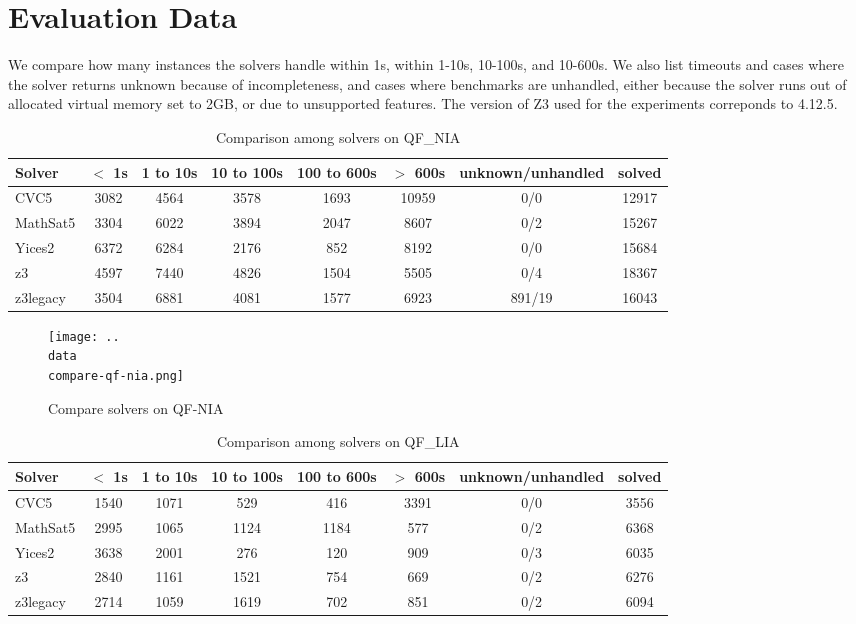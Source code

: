 \section{Evaluation Data}
\label{app:eval}

We compare how many instances the solvers handle within
1s, within 1-10s, 10-100s, and 10-600s. We also list
timeouts and cases where the solver returns unknown because of incompleteness,
and cases where benchmarks are unhandled, either because the solver runs out of allocated virtual memory set to 2GB,
or due to unsupported features. The version of Z3 used for the experiments correponds to 4.12.5.


\begin{table}
  \begin{tabular}{|l|c|c|c|c|c|c|c|}
    \hline
    Solver & $<$ 1s & 1 to 10s & 10 to 100s & 100 to 600s & $>$ 600s & unknown/unhandled & solved \\
    \hline
    CVC5 & 3082 & 4564 & 3578 & 1693 & 10959 & 0/0 & 12917 \\
    \hline
    MathSat5 & 3304 & 6022 & 3894 & 2047 & 8607 & 0/2 & 15267 \\
    \hline
    Yices2 & 6372 & 6284 & 2176 & 852 & 8192 & 0/0 & 15684 \\
    \hline
    z3 & 4597 & 7440 & 4826 & 1504 & 5505 & 0/4 & 18367 \\
    \hline
    z3legacy & 3504 & 6881 & 4081 & 1577 & 6923 & 891/19 & 16043 \\
    \hline
    \end{tabular}
  \caption{Comparison among solvers on QF\_NIA \label{tab:compare-qf-nia}}
\end{table}

\begin{figure}[htbp]
  \centering
  \texttt{[image: ..\\data\\compare-qf-nia.png]}
  \caption{Compare solvers on QF-NIA }
  \label{fig:organization}
\end{figure}

\begin{table}
  \begin{tabular}{|l|c|c|c|c|c|c|c|}
    \hline
    Solver & $<$ 1s & 1 to 10s & 10 to 100s & 100 to 600s & $>$ 600s & unknown/unhandled & solved \\
    \hline
    CVC5 & 1540 & 1071 & 529 & 416 & 3391 & 0/0 & 3556 \\
    \hline
    MathSat5 & 2995 & 1065 & 1124 & 1184 & 577 & 0/2 & 6368 \\
    \hline
    Yices2 & 3638 & 2001 & 276 & 120 & 909 & 0/3 & 6035 \\
    \hline
    z3 & 2840 & 1161 & 1521 & 754 & 669 & 0/2 & 6276 \\
    \hline
    z3legacy & 2714 & 1059 & 1619 & 702 & 851 & 0/2 & 6094 \\
    \hline
    \end{tabular}
  \caption{Comparison among solvers on QF\_LIA \label{tab:compare-qf-lia}}
\end{table}



